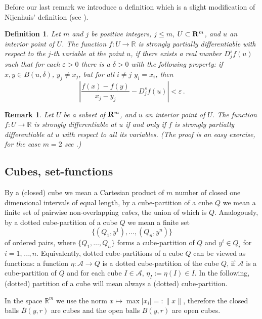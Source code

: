 \documentclass{article}
\newtheorem{definition}{Definition}
\newtheorem{remark}{Remark}
\newcommand{\R}{\ensuremath{\mathbb R}}
\newcommand{\ol}{\overline}
\begin{document}
Before our last remark we introduce a definition which is a slight
modification of Nijenhuis' definition (see \cite{Nijenhuis:74}).

\begin{definition}\label{epd}
Let $m$ and $j$ be positive integers, $j\le m$, $ U\subset{\bf
R}^m $, and $u$ an interior point of $U$. The function $f:U\to\R$
is \emph{strongly partially differen\-tiable} with respect to the
$j$-th variable at the point $u$, if there exists a real number
$D^s_jf(u)$ such that for each $ \varepsilon>0 $ there is a $
\delta>0$ with the following property: if $ x,y\in B(u,\delta) $,
$ y_j\neq x_j $, but for all $ i\neq j $ $ y_i=x_i $, then
$$\left|\frac{f(x)-f(y)}{x_j-y_j}-D^s_jf(u)\right|<\varepsilon\,.$$
\end{definition}

\begin{remark}\label{edepd}
Let $U$ be a subset of ${\bf R}^m $, and $u$ an interior point of
$U$. The function $f:U\to\R$ is strongly differentiable at $ u $
if and only if $ f $ is strongly partially differentiable at $ u $
with respect to all its variables. (The proof is an easy exercise,
for the case $m=2$ see \cite{Nijenhuis:74}.)
\end{remark}

\subsection{Cubes, set-functions}
By a (closed) cube we mean a Cartesian product of \(m\) number of
closed one dimensional intervals of equal length, by a
cube-partition of a cube \(Q\) we mean a finite set of pairwise
non-overlapping \emph{cubes}, the union of which is \(Q\).
Analogously, by a dotted cube-partition of a cube \(Q\) we mean a
finite set
\[ \{(Q_1,y^1),\ldots,(Q_n,y^n)\}\]
of ordered pairs, where \(\{Q_1,\ldots ,Q_n\}\) forms a cube-partition of \(Q\) and \(y^i\in Q_i\) for \(i=1,\ldots ,n\).
Equivalently, dotted cube-partitions of a cube \(Q\) can be viewed as functions: a function \(\eta:\mathcal{A}\to Q\)
is a dotted cube-partition of the cube \(Q\), if \(\mathcal{A}\) is a cube-partition of \(Q\) and for each cube
\(I\in \mathcal{A}\), \(\eta _I:=\eta (I)\in I\). In the following, (dotted) partition of a cube will mean always a (dotted) cube-partition.

In the space \(\R^m\) we use the norm \(x\mapsto\max|x_i|=:\|x\|\), therefore the closed balls \(\ol{B}(y,r)\)
are cubes and the open balls $ B(y,r) $ are open cubes.
\end{document}
